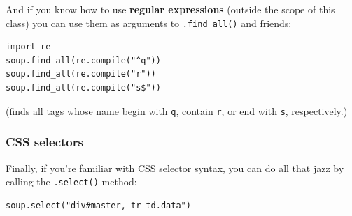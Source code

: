 
And if you know how to use \textbf{regular expressions} (outside the scope of
this class) you can use them as arguments to \texttt{.find\_all()} and
friends:

\begin{Verbatim}[fontsize=\small,samepage=true,frame=single,framesep=3mm]
import re
soup.find_all(re.compile("^q"))
soup.find_all(re.compile("r"))
soup.find_all(re.compile("s$"))
\end{Verbatim}

(finds all tags whose name begin with \texttt{q}, contain \texttt{r}, or end
with \texttt{s}, respectively.)

\subsubsection{CSS selectors}


Finally, if you're familiar with CSS selector syntax, you can do all that jazz
by calling the \texttt{.select()} method:

\begin{Verbatim}[fontsize=\small,samepage=true,frame=single,framesep=3mm]
soup.select("div#master, tr td.data")
\end{Verbatim}


